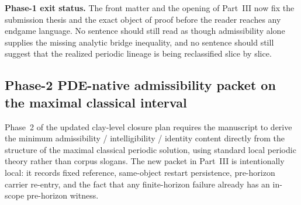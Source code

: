 \noindent\textbf{Phase-1 exit status.} The front matter and the opening of Part~III now fix the submission thesis and the exact object of proof before the reader reaches any endgame language. No sentence should still read as though admissibility alone supplies the missing analytic bridge inequality, and no sentence should still suggest that the realized periodic lineage is being reclassified slice by slice.

\subsection*{Phase-2 PDE-native admissibility packet on the maximal classical interval}
Phase~2 of the updated clay-level closure plan requires the manuscript to derive the minimum admissibility / intelligibility / identity content directly from the structure of the maximal classical periodic solution, using standard local periodic theory rather than corpus slogans. The new packet in Part~III is intentionally local: it records fixed reference, same-object restart persistence, pre-horizon carrier re-entry, and the fact that any finite-horizon failure already has an in-scope pre-horizon witness.

